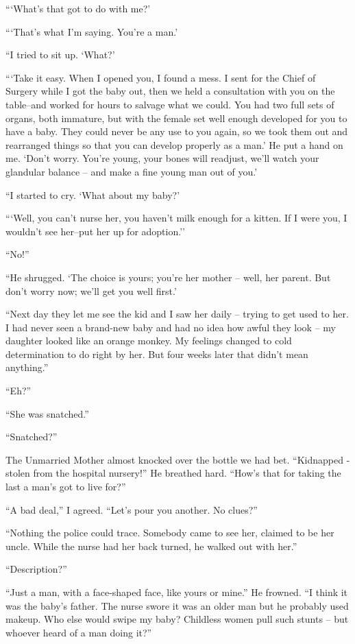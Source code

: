 ```What's that got to do with me?'

```That's what I'm saying. You're a man.'

``I tried to sit up. `What?'

```Take it easy. When I opened you, I  found  a  mess.  I
sent for the Chief of Surgery while I got the baby out, then we
held  a consultation with you on the table--and worked for hours
to salvage what we could. You had two full sets of organs, both
immature, but with the female set well enough developed for you
to have a baby. They could never be any use to you again, so we
took them out and rearranged things so  that  you  can  develop
properly  as  a  man.' He put a hand on me. `Don't worry. You're
young, your bones will readjust,  we'll  watch  your  glandular
balance -- and make a fine young man out of you.'

``I started to cry. `What about my baby?'

```Well, you can't nurse her, you haven't milk enough for
a kitten. If  I  were  you, I wouldn't see her--put her up for
adoption.''

``No!''

``He shrugged. `The choice is yours; you're her mother --
well, her parent. But don't  worry  now;  we'll  get  you  well
first.'

``Next day they let me see the kid and I saw her daily --
trying to  get  used  to her. I had never seen a brand-new baby
and had no idea how awful they look -- my daughter  looked  like
an orange monkey. My feelings changed to cold determination to
do right  by  her.  But  four  weeks  later  that  didn't  mean
anything.''

``Eh?''

``She was snatched.''

``Snatched?''

The  Unmarried Mother almost knocked over the bottle we had bet.
``Kidnapped - stolen from the hospital nursery!''  He
breathed hard. ``How's that for taking the last a man's got to
live for?''

``A  bad deal,'' I agreed. ``Let's pour you another. No clues?''

``Nothing the police could trace. Somebody came to  see
her,  claimed  to  be  her  uncle. While the nurse had her back
turned, he walked out with her.''

``Description?''

``Just a man, with a face-shaped face, like  yours  or
mine.'' He frowned. ``I think it was the baby's father. The
nurse swore it was an older man but he  probably  used  makeup.
Who  else would swipe my baby? Childless women pull such stunts
-- but whoever heard of a man doing it?''

